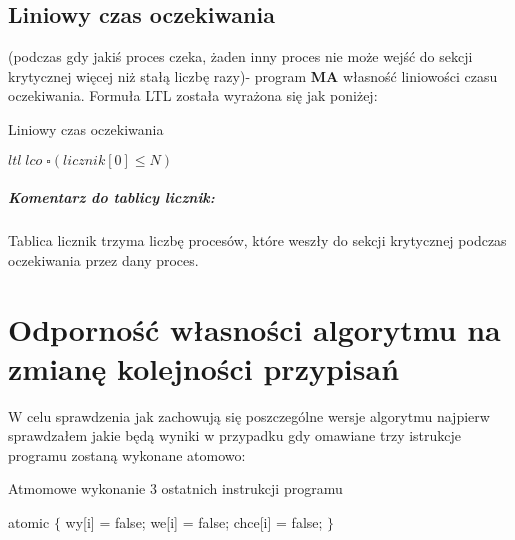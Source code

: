 \documentclass[oneside]{book}
\begin{document}

\section{Liniowy czas oczekiwania} (podczas gdy jakiś proces czeka, żaden inny proces nie może wejść do sekcji krytycznej więcej niż stałą liczbę razy)- program \textbf{MA} własność liniowości czasu oczekiwania. Formuła LTL została wyrażona się jak poniżej:
 \begin{algorithm}[H]                                                            
   \caption{Liniowy czas oczekiwania}\label{euclid}
   \begin{algorithmic}[1]                                                         
     \State $ltl \; lco \; {\square(licznik[0] \leq N) }  $ 
  \end{algorithmic}                                                             
\end{algorithm} 
 
 \paragraph{Komentarz do tablicy licznik:} Tablica licznik trzyma liczbę procesów, które weszły do sekcji krytycznej podczas oczekiwania przez dany proces.




\chapter{Odporność własności algorytmu na zmianę kolejności przypisań}

W celu sprawdzenia jak zachowują się poszczególne wersje algorytmu najpierw sprawdzałem jakie będą wyniki w przypadku gdy omawiane trzy istrukcje programu zostaną wykonane atomowo:
 \begin{algorithm}[H]                                                            
   \caption{Atmomowe wykonanie $3$ ostatnich instrukcji programu}\label{euclid}
   \begin{algorithmic}[1]                                                          
            \State atomic                                                              
           \State $\{$                                                                   
                \State  \hspace{\algorithmicindent} wy[i] = false;                                                  
                \State \hspace{\algorithmicindent} we[i] = false;                                                  
                 \State \hspace{\algorithmicindent} chce[i] = false;  
				\State$\}$
				
				  \end{algorithmic}                                                             
\end{algorithm}   
\end{document}
